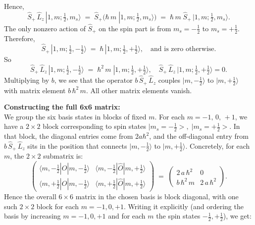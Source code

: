 \documentclass{article}
\begin{document}
Hence,
\[
\hat{S}_+\,\hat{L}_z\,|1,m;\tfrac12,m_s\rangle 
\;=\; \hat{S}_+\bigl(\hbar\,m\;|1,m;\tfrac12,m_s\rangle\bigr)
\;=\; \hbar\,m\;\hat{S}_+\,|1,m;\tfrac12,m_s\rangle.
\]
The only nonzero action of \(\hat{S}_+\) on the spin part is from \(m_s=-\tfrac12\) to \(m_s=+\tfrac12\). Therefore,
\[
\hat{S}_+\,|1,m;\tfrac12,-\tfrac12\rangle 
\;=\;\hbar\,|1,m;\tfrac12,+\tfrac12\rangle,\quad
\text{and is zero otherwise.}
\]
So
\[
\hat{S}_+\,\hat{L}_z\,|1,m;\tfrac12,-\tfrac12\rangle 
\;=\; \hbar^2\,m\;|1,m;\tfrac12,+\tfrac12\rangle,\quad
\hat{S}_+\,\hat{L}_z\,|1,m;\tfrac12,+\tfrac12\rangle=0.
\]
Multiplying by \(b\), we see that the operator \(b\,\hat{S}_+\,\hat{L}_z\) couples \(|m,-\tfrac12\rangle\) to \(|m,+\tfrac12\rangle\) with matrix element 
\(\displaystyle b\,\hbar^2\,m\). All other matrix elements vanish.

\textbf{Constructing the full 6x6 matrix:}\\
We group the six basis states in blocks of fixed \(m\). For each \(m=-1,\,0,\,+1\), we have a $2\times 2$ block corresponding to spin states \(\bigl|m_s=-\tfrac12\bigr>,\;\bigl|m_s=+\tfrac12\bigr>\). In that block, the diagonal entries come from \(2a\hbar^2\), and the off-diagonal entry from \(b\,\hat{S}_+\,\hat{L}_z\) sits in the position that connects \(|m,-\tfrac12\rangle\) to \(|m,+\tfrac12\rangle\). Concretely, for each \(m\), the $2\times 2$ submatrix is:
\[
\begin{pmatrix}
\langle m,-\tfrac12|\hat{O}|m,-\tfrac12\rangle & \langle m,-\tfrac12|\hat{O}|m,+\tfrac12\rangle \\[6pt]
\langle m,+\tfrac12|\hat{O}|m,-\tfrac12\rangle & \langle m,+\tfrac12|\hat{O}|m,+\tfrac12\rangle
\end{pmatrix}
\;=\;
\begin{pmatrix}
2\,a\,\hbar^2 & 0 \\[6pt]
b\,\hbar^2\,m & 2\,a\,\hbar^2
\end{pmatrix}.
\]
Hence the overall $6\times 6$ matrix in the chosen basis is block diagonal, with one such $2\times 2$ block for each \(m=-1,0,+1\). Writing it explicitly (and ordering the basis by increasing \(m=-1,0,+1\) and for each \(m\) the spin states \(-\tfrac12,+\tfrac12\)), we get:
\end{document}
